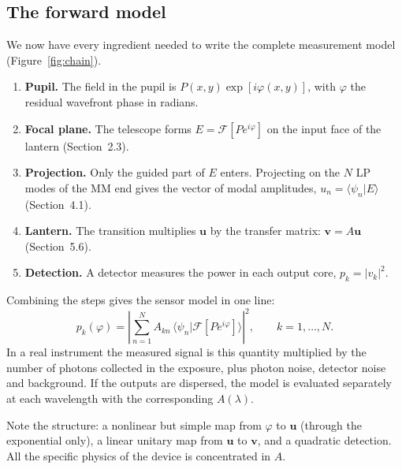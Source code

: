 \documentclass[11pt,a4paper]{article}
\newcommand{\uvec}{\mathbf{u}}
\newcommand{\vvec}{\mathbf{v}}
\newcommand{\braket}[2]{\langle #1|#2\rangle}
\begin{document}
\subsection{The forward model}
We now have every ingredient needed to write the complete measurement model (Figure~\ref{fig:chain}).
\begin{enumerate}
\item \textbf{Pupil.} The field in the pupil is $P(x,y)\exp[i\varphi(x,y)]$, with $\varphi$ the residual wavefront phase in radians.
\item \textbf{Focal plane.} The telescope forms $E = \mathcal{F}[P e^{i\varphi}]$ on the input face of the lantern (Section~2.3).
\item \textbf{Projection.} Only the guided part of $E$ enters. Projecting on the $N$ LP modes of the MM end gives the vector of modal amplitudes, $u_n = \braket{\psi_n}{E}$ (Section~4.1).
\item \textbf{Lantern.} The transition multiplies $\uvec$ by the transfer matrix: $\vvec = A\uvec$ (Section~5.6).
\item \textbf{Detection.} A detector measures the power in each output core, $p_k = |v_k|^2$.
\end{enumerate}

Combining the steps gives the sensor model in one line:
\begin{equation}
p_k(\varphi) = \left| \sum_{n=1}^{N} A_{kn}\, \braket{\psi_n}{\mathcal{F}[P e^{i\varphi}]} \right|^2,
\qquad k = 1,\ldots,N.
\label{eq:forward}
\end{equation}
In a real instrument the measured signal is this quantity multiplied by the number of photons collected in the exposure, plus photon noise, detector noise and background. If the outputs are dispersed, the model is evaluated separately at each wavelength with the corresponding $A(\lambda)$.

Note the structure: a nonlinear but simple map from $\varphi$ to $\uvec$ (through the exponential only), a linear unitary map from $\uvec$ to $\vvec$, and a quadratic detection. All the specific physics of the device is concentrated in $A$.
\end{document}
